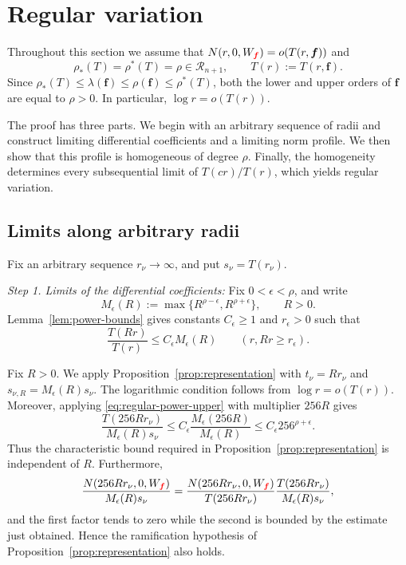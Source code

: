\documentclass[12pt,letterpaper,reqno]{amsart}
\theoremstyle{definition}
\numberwithin{equation}{section}
\newcommand{\Gn}{\mathcal R_{n+1}}
\newcommand{\fv}{\bm f}
\newcommand{\revision}[1]{\textcolor{red}{#1}}
\begin{document}
\section{Regular variation}\label{sec:regular}

Throughout this section we assume that
\(N(r,0,W_{\revision{\fv}})=o(T(r,\fv))\) and
\[
\rho_*(T)=\rho^*(T)=\rho\in\Gn,
\qquad
T(r):=T(r,\fv).
\]
Since
\(\rho_*(T)\leq\lambda(\fv)\leq\rho(\fv)\leq\rho^*(T)\),
both the lower and upper orders of \(\fv\) are equal to \(\rho>0\).
In particular, \(\log r=o(T(r))\).


The proof has three parts. We begin with an arbitrary sequence of
radii and construct limiting differential coefficients and a limiting
norm profile. We then show that this profile is homogeneous of degree
\(\rho\). Finally, the homogeneity determines every subsequential limit
of \(T(cr)/T(r)\), which yields regular variation.


\subsection{Limits along arbitrary radii}

Fix an arbitrary sequence \(r_\nu\to\infty\), and put
\(s_\nu=T(r_\nu)\).

\medskip\noindent
\emph{{Step 1. Limits of the differential coefficients:}}
Fix \(0<\epsilon<\rho\), and write
\[
M_\epsilon(R)
:=
\max\{R^{\rho-\epsilon},R^{\rho+\epsilon}\},
\qquad R>0.
\]
Lemma~\ref{lem:power-bounds} gives constants
\(C_\epsilon\geq1\) and \(r_\epsilon>0\) such that
\begin{equation}\label{eq:regular-power-upper}
 \frac{T(Rr)}{T(r)}
 \leq
 C_\epsilon M_\epsilon(R)
 \qquad
 (r,Rr\geq r_\epsilon).
\end{equation}

Fix \(R>0\). We apply Proposition~\ref{prop:representation} with
\(t_\nu=Rr_\nu\) and
\(s_{\nu,R}=M_\epsilon(R)s_\nu\).
The logarithmic condition follows from
\(\log r=o(T(r))\). Moreover, applying
\eqref{eq:regular-power-upper} with multiplier \(256R\) gives
\[
\frac{T(256Rr_\nu)}{M_\epsilon(R)s_\nu}
\leq
C_\epsilon
\frac{M_\epsilon(256R)}{M_\epsilon(R)}
\leq
C_\epsilon256^{\rho+\epsilon}.
\]
Thus the characteristic bound required in
Proposition~\ref{prop:representation} is independent of \(R\).
Furthermore,
\[
\frac{N(256Rr_\nu,0,W_{\revision{\fv}})}
     {M_\epsilon(R)s_\nu}
=
\frac{N(256Rr_\nu,0,W_{\revision{\fv}})}
     {T(256Rr_\nu)}
\frac{T(256Rr_\nu)}
     {M_\epsilon(R)s_\nu},
\]
and the first factor tends to zero while the second is bounded by the
estimate just obtained. Hence the ramification hypothesis of
Proposition~\ref{prop:representation} also holds.
\end{document}
